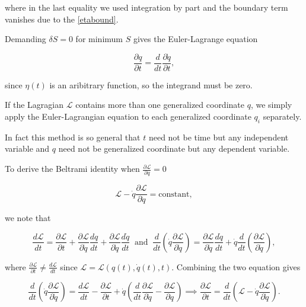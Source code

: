 \documentclass[a4paper,12pt]{report}
\begin{document}
where in the last equality we used integration by part and the boundary term vanishes due to the \cref{etabound}. 

Demanding \(\delta S = 0\) for minimum \(S\) gives the Euler-Lagrange equation

\begin{equation}
	\frac{\partial q}{\partial t} = \frac{d}{dt} \frac{\partial \dot{q} }{\partial t},
\end{equation}

since \(\eta (t)\) is an aribitrary function, so the integrand must be zero. 

If the Lagragian \(\mathcal{L}\) contains more than one generalized coordinate \(q\), we simply apply the Euler-Lagrangian equation to each generalized coordinate \(q_{i} \) separately.   

In fact this method is so general that \(t\) need not be time but any independent variable and \(q\) need not be generalized coordinate but any dependent variable. 

To derive the Beltrami identity when \(\frac{\partial \mathcal{L}}{\partial q} = 0 \)

\begin{equation}
	\mathcal{L} - \dot{q} \frac{\partial \mathcal{L}}{\partial \dot{q} } = \text{constant},
\end{equation}

we note that 

\begin{equation}
	\frac{d \mathcal{L}}{dt} = \frac{\partial \mathcal{L}}{\partial t} + \frac{\partial \mathcal{L}}{\partial \dot{q} } \frac{dq}{dt} +  \frac{\partial \mathcal{L}}{\partial \dot{q} } \frac{d \dot{q} }{dt} ~\text { and }~ \frac{d}{dt}\left( \dot{q} \frac{\partial \mathcal{L}}{\partial \dot{q} }  \right) = \frac{\partial \mathcal{L}}{\partial \dot{q} } \frac{d \dot{q} }{dt} + \dot{q} \frac{d}{dt}\left( \frac{\partial \mathcal{L}}{\partial \dot{q} }  \right),
\end{equation}

where \(\frac{\partial \mathcal{L}}{\partial t} \neq \frac{d \mathcal{L}}{dt}  \) since \(\mathcal{L} = \mathcal{L}(q(t), \dot{q} (t),t)\). Combining the two equation gives 

\begin{equation}
	\frac{d}{dt} \left( \dot{q} \frac{\partial \mathcal{L}}{\partial \dot{q} }  \right) = \frac{d \mathcal{L}}{dt} - \frac{\partial \mathcal{L}}{\partial t} + \dot{q} \left( \frac{d}{dt} \frac{\partial \mathcal{L}}{\partial \dot{q} }  - \frac{\partial \mathcal{L}}{\partial q} \right) \implies \frac{\partial \mathcal{L}}{\partial t} = \frac{d}{dt} \left( \mathcal{L} - \dot{q} \frac{\partial \mathcal{L}}{\partial \dot{q} } \right).
\end{equation}
\end{document}

